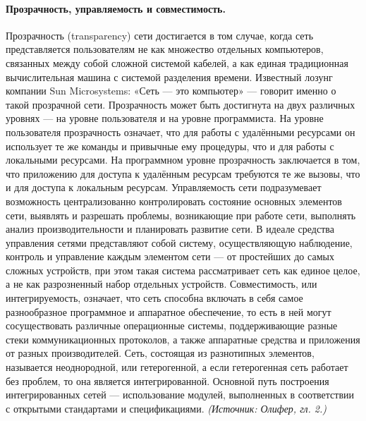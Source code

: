 \documentclass[a4paper,12pt]{article}
\begin{document}
\paragraph{Прозрачность, управляемость и совместимость.}
Прозрачность (transparency) сети достигается в том случае, когда сеть представляется пользователям не как множество отдельных компьютеров, связанных между собой сложной системой кабелей, а как единая традиционная вычислительная машина с системой разделения времени. Известный лозунг компании Sun Microsystems: «Сеть — это компьютер» — говорит именно о такой прозрачной сети. Прозрачность может быть достигнута на двух различных уровнях — на уровне пользователя и на уровне программиста. На уровне пользователя прозрачность означает, что для работы с удалёнными ресурсами он использует те же команды и привычные ему процедуры, что и для работы с локальными ресурсами. На программном уровне прозрачность заключается в том, что приложению для доступа к удалённым ресурсам требуются те же вызовы, что и для доступа к локальным ресурсам. Управляемость сети подразумевает возможность централизованно контролировать состояние основных элементов сети, выявлять и разрешать проблемы, возникающие при работе сети, выполнять анализ производительности и планировать развитие сети. В идеале средства управления сетями представляют собой систему, осуществляющую наблюдение, контроль и управление каждым элементом сети — от простейших до самых сложных устройств, при этом такая система рассматривает сеть как единое целое, а не как разрозненный набор отдельных устройств. Совместимость, или интегрируемость, означает, что сеть способна включать в себя самое разнообразное программное и аппаратное обеспечение, то есть в ней могут сосуществовать различные операционные системы, поддерживающие разные стеки коммуникационных протоколов, а также аппаратные средства и приложения от разных производителей. Сеть, состоящая из разнотипных элементов, называется неоднородной, или гетерогенной, а если гетерогенная сеть работает без проблем, то она является интегрированной. Основной путь построения интегрированных сетей — использование модулей, выполненных в соответствии с открытыми стандартами и спецификациями.
\textit{(Источник: Олифер, гл. 2.)}
\end{document}
